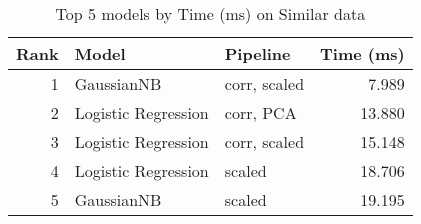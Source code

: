 \begin{table}[!htb]
\caption{Top 5 models by Time (ms) on Similar data}
\label{table-top-5-time-(ms)-similar}
\centering
\begin{tabular}{rllr}
\toprule
Rank & Model & Pipeline & Time (ms) \\
\midrule
1 & GaussianNB & corr, scaled & 7.989 \\
2 & Logistic Regression & corr, PCA & 13.880 \\
3 & Logistic Regression & corr, scaled & 15.148 \\
4 & Logistic Regression & scaled & 18.706 \\
5 & GaussianNB & scaled & 19.195 \\
\bottomrule
\end{tabular}
\end{table}

